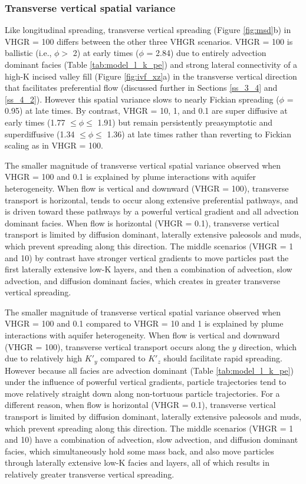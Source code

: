 \subsubsection{Transverse vertical spatial variance}
\label{ss_3_2b}
Like longitudinal spreading, transverse vertical spreading (Figure \ref{fig:msd}b) in VHGR = 100 differs between the other three VHGR scenarios. VHGR = 100 is ballistic (i.e., $\phi >$ 2) at early times ($\phi$ = 2.84) due to entirely advection dominant facies (Table \ref{tab:model_l_k_pe}) and strong lateral connectivity of a high-K incised valley fill (Figure \ref{fig:ivf_xz}a) in the transverse vertical direction that facilitates preferential flow (discussed further in Sections \ref{ss_3_4} and \ref{ss_4_2}). However this spatial variance slows to nearly Fickian spreading ($\phi$ = 0.95) at late times. By contrast, VHGR = 10, 1, and 0.1 are super diffusive at early times (1.77 $\leq \phi \leq$ 1.91) but remain persistently preasymptotic and superdiffusive (1.34 $\leq \phi \leq$ 1.36) at late times rather than reverting to Fickian scaling as in VHGR = 100. 

The smaller magnitude of transverse vertical spatial variance observed when VHGR = 100 and 0.1 is explained by plume interactions with aquifer heterogeneity. When flow is vertical and downward (VHGR = 100), transverse transport is horizontal, tends to occur along extensive preferential pathways, and is driven toward these pathways by a powerful vertical gradient and all advection dominant facies. When flow is horizontal (VHGR = 0.1), transverse vertical transport is limited by diffusion dominant, laterally extensive paleosols and muds, which prevent spreading along this direction. The middle scenarios (VHGR = 1 and 10) by contrast have stronger vertical gradients to move particles past the first laterally extensive low-K layers, and then a combination of advection, slow advection, and diffusion dominant facies, which creates in greater transverse vertical spreading. 

The smaller magnitude of transverse vertical spatial variance observed when VHGR = 100 and 0.1 compared to VHGR = 10 and 1 is explained by plume interactions with aquifer heterogeneity. When flow is vertical and downward (VHGR = 100), transverse vertical transport occurs along the $y$ direction, which due to relatively high $K'_y$ compared to $K'_z$ should facilitate rapid spreading. However because all facies are advection dominant (Table \ref{tab:model_l_k_pe}) under the influence of powerful vertical gradients, particle trajectories tend to move relatively straight down along non-tortuous particle trajectories. For a different reason, when flow is horizontal (VHGR = 0.1), transverse vertical transport is limited by diffusion dominant, laterally extensive paleosols and muds, which prevent spreading along this direction. The middle scenarios (VHGR = 1 and 10) have a combination of advection, slow advection, and diffusion dominant facies, which simultaneously hold some mass back, and also move particles through laterally extensive low-K facies and layers, all of which results in relatively greater transverse vertical spreading. 


